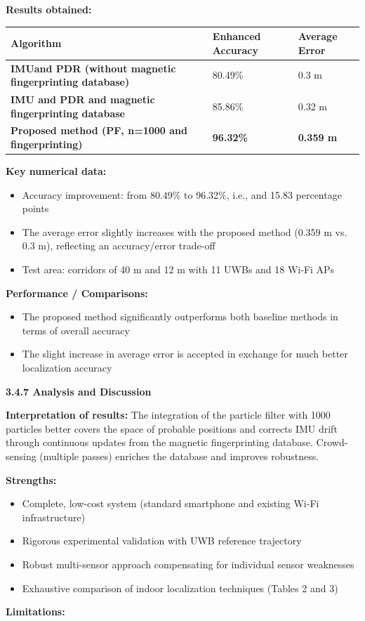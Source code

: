 \documentclass{ipgpmaster}
\begin{document}
\textbf{Results obtained:}
\begin{table}
\centering

\begin{tabular}{l l l}
\textbf{Algorithm} & \textbf{Enhanced Accuracy} & \textbf{Average Error} \\
\hline
\textbf{IMUand  PDR (without magnetic fingerprinting database)} & 80.49\% & 0.3 m \\
\hline
\textbf{IMU and  PDR and  magnetic fingerprinting database} & 85.86\% & 0.32 m \\
\hline
\textbf{Proposed method (PF, n=1000 and  fingerprinting)} & \textbf{96.32\%} & \textbf{0.359 m} \\
\hline

\end{tabular}

\end{table}

\textbf{Key numerical data:}
\begin{itemize}
    \item Accuracy improvement: from 80.49\% to 96.32\%, i.e., and 15.83 percentage points
    \item The average error slightly increases with the proposed method (0.359 m vs. 0.3 m), reflecting an accuracy/error trade-off
    \item Test area: corridors of 40 m and  12 m with 11 UWBs and 18 Wi-Fi APs

\end{itemize}
\textbf{Performance / Comparisons:}

\begin{itemize}
    \item The proposed method significantly outperforms both baseline methods in terms of overall accuracy
    \item The slight increase in average error is accepted in exchange for much better localization accuracy


\end{itemize}
 \textbf{3.4.7 Analysis and Discussion}

\textbf{Interpretation of results:} The integration of the particle filter with 1000 particles better covers the space of probable positions and corrects IMU drift through continuous updates from the magnetic fingerprinting database. Crowd-sensing (multiple passes) enriches the database and improves robustness.

\textbf{Strengths:}

\begin{itemize}
    \item Complete, low-cost system (standard smartphone and  existing Wi-Fi infrastructure)
    \item Rigorous experimental validation with UWB reference trajectory
    \item Robust multi-sensor approach compensating for individual sensor weaknesses
    \item Exhaustive comparison of indoor localization techniques (Tables 2 and 3)
\end{itemize}
\textbf{Limitations:}
\end{document}
